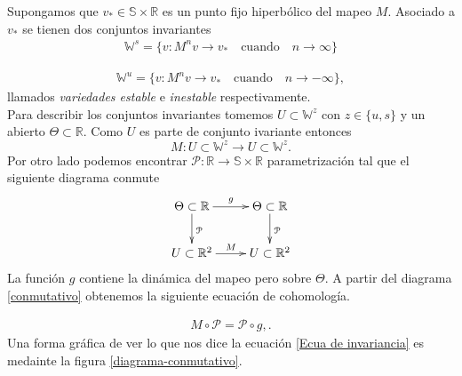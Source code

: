 
Supongamos que $v_{*}\in\mathbb{S} \times \mathbb{R}$ es un punto fijo hiperb\'olico del mapeo $M$. Asociado a $v_{*}$ se tienen dos conjuntos invariantes 
\begin{eqnarray}
\mathbb{W}^{s}=\lbrace v : M^{n}v\rightarrow v_{*} \quad \mathrm{cuando} \quad n\rightarrow \infty \rbrace
\label{variedad estable}
\end{eqnarray}

\begin{eqnarray}
\mathbb{W}^{u}=\lbrace v : M^{n}v\rightarrow v_{*} \quad \mathrm{cuando} \quad n\rightarrow -\infty \rbrace
\label{variedad inestable},
\end{eqnarray}
llamados \textit{variedades estable} e \textit{inestable} respectivamente. \\

Para describir los conjuntos invariantes tomemos  $U\subset \mathbb{W}^{z}$ con $z\in \{u,s\}$ y un abierto $\Theta \subset \mathbb{R}$. Como $U$ es parte de conjunto ivariante entonces
\begin{equation}
M : U\subset \mathbb{W}^{z} \longrightarrow  U\subset \mathbb{W}^{z}.
\end{equation}
Por otro lado podemos encontrar $\mathcal{P}:\mathbb{R}\longrightarrow\mathbb{S} \times \mathbb{R}$ parametrizaci\'on tal que el siguiente diagrama conmute
\begin{eqnarray}
\xymatrix{
	\Theta\subset\mathbb{R} \ar[d]^{\mathcal{P}} \ar[r]^{g} & \Theta\subset\mathbb{R} \ar[d]^{\mathcal{P}} \\
	U\subset\mathbb{R}^{2} \ar[r]^{M} & U\subset\mathbb{R}^{2}
}\label{conmutativo}
\end{eqnarray}
La funci\'on $g$ contiene la dinámica del mapeo pero sobre $\Theta$. A partir del diagrama \ref{conmutativo} obtenemos la siguiente ecuaci\'on de cohomolog\'ia. 

\begin{eqnarray}
M \circ \mathcal{P} =\mathcal{P}  \circ g,  \label{Ecua de invariancia}.
\end{eqnarray}
Una forma gr\'afica de ver lo que nos dice la ecuaci\'on \ref{Ecua de invariancia} es medainte la figura 
\ref{diagrama-conmutativo}.

